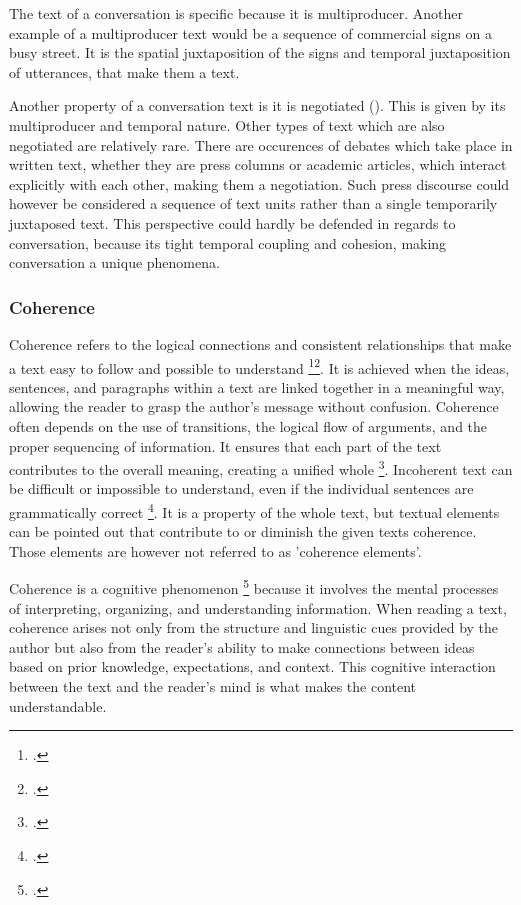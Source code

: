 \documentclass[12pt]{report}
\begin{document}
{\par
    The text of a conversation is specific because it is multiproducer.
    Another example of a multiproducer text
    would be a sequence of commercial signs on a busy street.
    It is the spatial juxtaposition of the signs and temporal juxtaposition of utterances,
    that make them a text.

    \par
    Another property of a conversation text is it is negotiated ().
    This is given by its multiproducer and temporal nature.
    Other types of text which are also negotiated are relatively rare.
    There are occurences of debates which take place in written text,
    whether they are press columns or academic articles, which
    interact explicitly with each other, making them a negotiation.
    Such press discourse could however be considered
    a sequence of text units rather than a single temporarily juxtaposed text.
    This perspective could hardly be defended in regards to conversation, because
    its tight temporal coupling and cohesion,
    making conversation a unique phenomena.

\subsubsection{Coherence}
\par
    Coherence refers to the logical connections and consistent relationships that
    make a text easy to follow and possible to understand \footcite[p.~83]{givón2020coherence}\footcite[p.~9]{hrbacek1994}.
    It is achieved when the ideas, sentences, and paragraphs within a text are linked together in a meaningful way,
    allowing the reader to grasp the author's message without confusion.
    Coherence often depends on the use of transitions, the logical flow of arguments, and the proper sequencing of information.
    It ensures that each part of the text contributes to the overall meaning, creating a unified whole \footcite[p.~28]{hrbacek1994}.
    Incoherent text can be difficult or impossible to understand, even if the individual sentences are grammatically correct \footcite[p.~30]{hrbacek1994}.
    It is a property of the whole text, but
    textual elements can be pointed out that contribute to or diminish the given texts coherence.
    Those elements are however not referred to as 'coherence elements'.

\par
    Coherence is a cognitive phenomenon \footcite{Roberts01101993} because
    it involves the mental processes of interpreting, organizing, and understanding information.
    When reading a text,
    coherence arises not only from the structure and linguistic cues provided by the author but
    also from the reader's ability to
    make connections between ideas based on prior knowledge, expectations, and context.
    This cognitive interaction between the text and the reader’s mind is what makes the content understandable.

}
\end{document}

